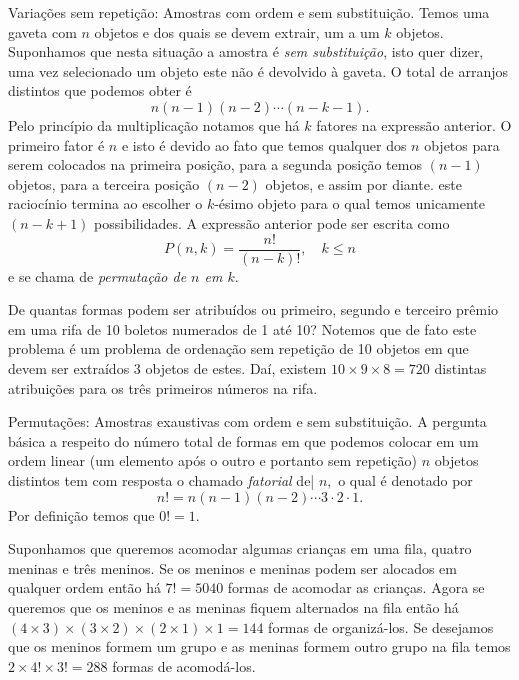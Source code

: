 \begin{frame}{Variações sem repetição: Amostras com ordem e sem substituição.} Temos uma gaveta com $n$ objetos e dos quais se devem extrair, um a um $k$ objetos. Suponhamos que nesta situação a amostra é {\it sem substituição}, isto quer dizer, uma vez selecionado um  objeto este não é devolvido à gaveta. O total de arranjos distintos que podemos obter é 
\begin{equation}
\label{perm1}
n(n-1)(n-2)\cdots (n-k-1). 
\end{equation}
Pelo princípio da multiplicação notamos que há $k$ fatores na expressão anterior. O primeiro fator é $n$ e isto é devido ao fato que temos qualquer dos $n$ objetos para serem colocados na primeira posição, para a segunda posição temos $(n-1)$ objetos, para a terceira posição $(n-2)$ objetos, e assim por diante. este raciocínio termina ao escolher o $k$-ésimo objeto para o qual temos unicamente $(n-k+1)$ possibilidades. A expressão anterior pode ser escrita como 
$$
P(n,k) = \frac{n!}{(n-k)!}, \quad k \leq n
$$ 
e se chama de {\it permutação de $n$ em $k$}. 
 \begin{exem}
De quantas formas podem ser atribuídos ou primeiro, segundo e terceiro prêmio em uma rifa de 10 boletos numerados de 1 até 10? Notemos que de fato este problema é um problema de ordenação sem repetição de 10 objetos em que devem ser extraídos 3 objetos de estes. Daí, existem $10\times 9\times 8=720 $ distintas atribuições para os três primeiros números na rifa. 
\end{exem}

 
\end{frame}


\begin{frame}{Permutações: Amostras exaustivas com ordem e sem substituição.} A pergunta básica a respeito do número total de formas em que podemos colocar em um ordem linear (um  elemento após o outro e portanto sem repetição) $n$ objetos distintos tem com resposta o chamado {\it fatorial} de| $n,$ o qual é denotado por $$n! = n(n-1)(n-2)\cdots 3\cdot 2 \cdot 1.$$ Por definição temos que $0!=1.$

\begin{exem}
Suponhamos que queremos acomodar algumas crianças em uma fila, quatro meninas e três meninos. Se os meninos e meninas podem ser alocados em qualquer ordem então há $7!=5040$ formas de acomodar as crianças. Agora se queremos que os meninos e as meninas fiquem alternados na fila então há 
$(4\times 3) \times (3\times 2) \times (2\times 1) \times 1 = 144$ formas de organizá-los. Se desejamos que os meninos formem um grupo e as meninas formem outro grupo na fila temos $2\times 4! \times 3! =288$ formas de acomodá-los. 
\end{exem}

\end{frame}


